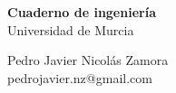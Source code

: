 \documentclass[a4paper,spanish,12pt]{report}
\title{\textitle}
\author{\texauthor}
\makeatletter
\newcommand{\textitle}{Cuaderno de ingenier\'ia}
\newcommand{\texuniversity}{Universidad de Murcia}
\newcommand{\texauthor}{Pedro Javier Nicol\'as Zamora}
\newcommand{\texemail}{pedrojavier.nz@gmail.com}
\makeatother
\begin{document}
\begin{titlepage}
\thispagestyle{firstpage}
\begin{center}
\vspace*{6cm}
\begin{Huge}
\textbf{\textitle} \\
\texuniversity \\
\end{Huge}
\vspace*{2.0cm}
\begin{large}
\texauthor \\
\texemail \\
\end{large}
\end{center}
\end{titlepage}
\setcounter{page}{2}
\end{document}
